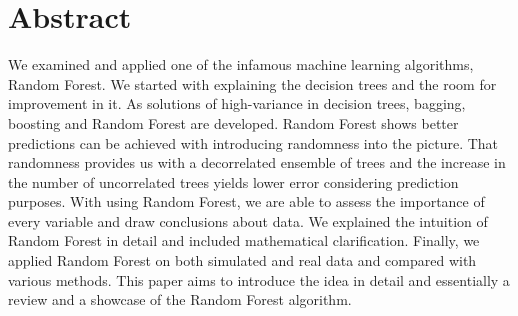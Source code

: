 \section*{Abstract}
\thispagestyle{empty}
We examined and applied one of the infamous machine learning algorithms, Random Forest. 
We started with explaining the decision trees and the room for improvement in it. 
As solutions of high-variance in decision trees, bagging, boosting and Random Forest are developed. 
Random Forest shows better predictions can be achieved with introducing randomness into the picture.
That randomness provides us with a decorrelated ensemble of trees and 
the increase in the number of uncorrelated trees yields lower error considering prediction purposes.
With using Random Forest, we are able to assess the importance of every variable and draw conclusions about data.
We explained the intuition of Random Forest in detail and included mathematical clarification. 
Finally, we applied Random Forest on both simulated and real data and compared with various methods. 
This paper aims to introduce the idea in detail and essentially a review and a showcase of the Random Forest algorithm. 





